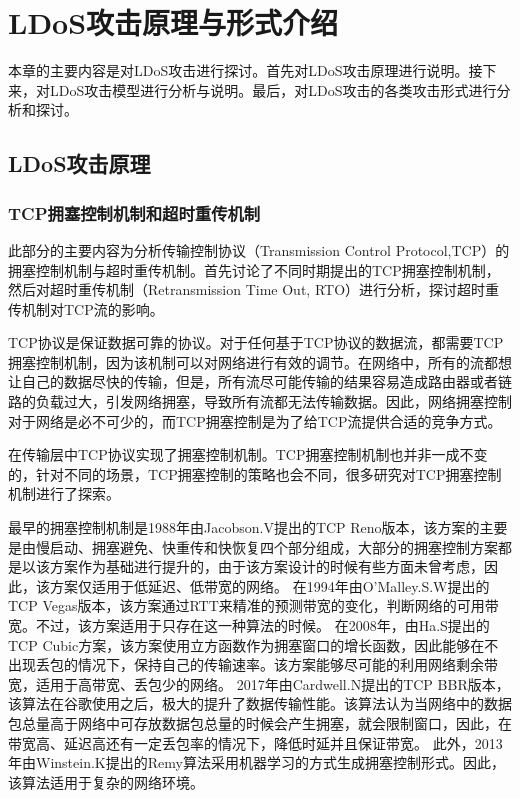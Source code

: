 \chapter{LDoS攻击原理与形式介绍}
\label{cha:LDoS}

本章的主要内容是对LDoS攻击进行探讨。首先对LDoS攻击原理进行说明。接下来，对LDoS攻击模型进行分析与说明。最后，对LDoS攻击的各类攻击形式进行分析和探讨。

\section{LDoS攻击原理}
\label{chap3:LDoSstate}

\subsection{TCP拥塞控制机制和超时重传机制}

此部分的主要内容为分析传输控制协议（Transmission Control Protocol,TCP）的拥塞控制机制与超时重传机制。首先讨论了不同时期提出的TCP拥塞控制机制，然后对超时重传机制（Retransmission Time Out, RTO）进行分析，探讨超时重传机制对TCP流的影响。

TCP协议是保证数据可靠的协议。对于任何基于TCP协议的数据流，都需要TCP拥塞控制机制，因为该机制可以对网络进行有效的调节。在网络中，所有的流都想让自己的数据尽快的传输，但是，所有流尽可能传输的结果容易造成路由器或者链路的负载过大，引发网络拥塞，导致所有流都无法传输数据。因此，网络拥塞控制对于网络是必不可少的，而TCP拥塞控制是为了给TCP流提供合适的竞争方式。

在传输层中TCP协议实现了拥塞控制机制。TCP拥塞控制机制也并非一成不变的，针对不同的场景，TCP拥塞控制的策略也会不同，很多研究对TCP拥塞控制机制进行了探索。

最早的拥塞控制机制是1988年由Jacobson.V\cite{Jacobson1988Congestion}提出的TCP Reno版本，该方案的主要是由慢启动、拥塞避免、快重传和快恢复四个部分组成，大部分的拥塞控制方案都是以该方案作为基础进行提升的，由于该方案设计的时候有些方面未曾考虑，因此，该方案仅适用于低延迟、低带宽的网络。
在1994年由O’Malley.S.W\cite{O1994TCP}提出的TCP Vegas版本，该方案通过RTT来精准的预测带宽的变化，判断网络的可用带宽。不过，该方案适用于只存在这一种算法的时候。
在2008年，由Ha.S\cite{Ha2008CUBIC}提出的TCP Cubic方案，该方案使用立方函数作为拥塞窗口的增长函数，因此能够在不出现丢包的情况下，保持自己的传输速率。该方案能够尽可能的利用网络剩余带宽，适用于高带宽、丢包少的网络。
2017年由Cardwell.N\cite{Cardwell2017BBR}提出的TCP BBR版本，该算法在谷歌使用之后，极大的提升了数据传输性能。该算法认为当网络中的数据包总量高于网络中可存放数据包总量的时候会产生拥塞，就会限制窗口，因此，在带宽高、延迟高还有一定丢包率的情况下，降低时延并且保证带宽。
此外，2013年由Winstein.K\cite{Winstein2013Remy}提出的Remy算法采用机器学习的方式生成拥塞控制形式。因此，该算法适用于复杂的网络环境。

